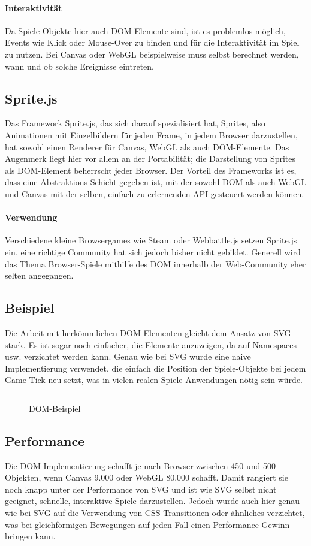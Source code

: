 \documentclass[a4paper, 12pt]{article}
\begin{document}
\paragraph{Interaktivität} Da Spiele-Objekte hier auch DOM-Elemente sind, ist es problemlos möglich, Events wie Klick oder Mouse-Over zu binden und für die Interaktivität im Spiel zu nutzen. Bei Canvas oder WebGL beispielweise muss selbst berechnet werden, wann und ob solche Ereignisse eintreten.
\subsection{Sprite.js}
Das Framework  Sprite.js, das sich darauf spezialisiert hat, Sprites, also Animationen mit Einzelbildern für jeden Frame, in jedem Browser darzustellen, hat sowohl einen Renderer für Canvas, WebGL als auch DOM-Elemente. Das Augenmerk liegt hier vor allem an der Portabilität; die Darstellung von Sprites als DOM-Element beherrscht jeder Browser. Der Vorteil des Frameworks ist es, dass eine Abstraktions-Schicht gegeben ist, mit der sowohl DOM als auch WebGL und Canvas mit der selben, einfach zu erlernenden API gesteuert werden können.
\paragraph{Verwendung} Verschiedene kleine Browsergames wie Steam oder Webbattle.js setzen Sprite.js ein, eine richtige Community hat sich jedoch bisher nicht gebildet. Generell wird das Thema Browser-Spiele mithilfe des DOM innerhalb der Web-Community eher selten angegangen.
\subsection{Beispiel}
Die Arbeit mit herkömmlichen DOM-Elementen gleicht dem Ansatz von SVG stark. Es ist sogar noch einfacher, die Elemente anzuzeigen, da auf Namespaces usw. verzichtet werden kann. Genau wie bei SVG wurde eine naive Implementierung verwendet, die einfach die Position der Spiele-Objekte bei jedem Game-Tick neu setzt, was in vielen realen Spiele-Anwendungen nötig sein würde.
\begin{figure}[H]
	\inputminted{javascript}{assets/vanilladom_example.js}
	\caption{DOM-Beispiel}
	\label{dom_example}
\end{figure}
\newpage
\subsection{Performance}
Die DOM-Implementierung schafft je nach Browser zwischen 450 und 500 Objekten, wenn Canvas 9.000 oder WebGL 80.000 schafft. Damit rangiert sie noch knapp unter der Performance von SVG und ist wie SVG selbst nicht geeignet, schnelle, interaktive Spiele darzustellen. Jedoch wurde auch hier genau wie bei SVG auf die Verwendung von CSS-Transitionen oder ähnliches verzichtet, was bei gleichförmigen Bewegungen auf jeden Fall einen Performance-Gewinn bringen kann.
\end{document}
